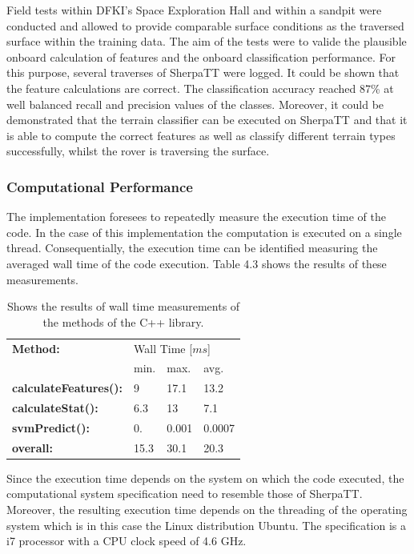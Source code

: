 \documentclass{article}
\begin{document}
Field tests within DFKI's Space Exploration Hall and within a sandpit were conducted and allowed to provide comparable surface conditions as the traversed surface within the training data. The aim of the tests were to valide the plausible onboard calculation of features and the onboard classification performance. For this purpose, several traverses of SherpaTT were logged. It could be shown that the feature calculations are correct. The classification accuracy reached 87\% at well balanced recall and precision values of the classes. 
Moreover, it could be demonstrated that the terrain classifier can be executed on SherpaTT and that it is able to compute the correct features as well as classify different terrain types successfully, whilst the rover is traversing the surface.
 

\subsubsection{Computational Performance}


The implementation foresees to repeatedly measure the execution time of the code. In the case of this implementation the computation is executed on a single thread. Consequentially, the execution time can be identified measuring the averaged wall time of the code execution. Table 4.3 shows the results of these measurements. 
\begin{table}[htb!]
   \centering
    \caption{Shows the results of wall time measurements of the methods of the C++ library.}\label{fig:compmeasurments}
    \begin{tabularx}{\columnwidth}{X|XXX}
    \textbf{Method:} & \multicolumn{3}{X}{Wall Time [$ms$]} \\
    &min.&max.&avg.\\
    \hline
    \hline
\textbf{calculateFeatures():} & 9&  17.1& 13.2 \\
\textbf{calculateStat():}     & 6.3 & 13 & 7.1 \\
\textbf{svmPredict():}        &  0. &  0.001 & 0.0007  \\
\hline
\textbf{overall:}             & 15.3 & 30.1 &20.3  \\
    \end{tabularx}	
\end{table}
Since the execution time depends on the system on which the code executed, the computational system specification need to resemble those of SherpaTT. Moreover, the resulting execution time depends
on the threading of the operating system which is in this case the Linux distribution Ubuntu. The specification is a i7 processor with a CPU clock speed of 4.6 GHz. 
\end{document}
